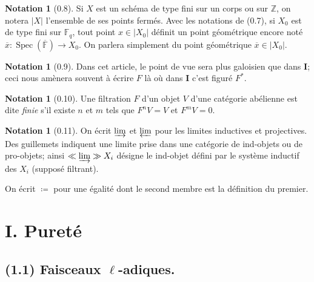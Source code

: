 \documentclass[12pt,a4paper]{article}
\theoremstyle{plain}
\theoremstyle{definition}
\newtheorem{notation}[theorem]{Notation}
\theoremstyle{definition}
\theoremstyle{remark}
\DeclareMathOperator{\Spec}{Spec}
\newcommand{\limind}{\varinjlim}
\newcommand{\limproj}{\varprojlim}
\begin{document}
\begin{notation}[0.8]
Si $X$ est un sch\'ema de type fini sur un corps ou sur $\mathbb{Z}$, on notera $|X|$ l'ensemble de ses points ferm\'es. Avec les notations de (0.7), si $X_0$ est de type fini sur $\mathbb{F}_q$, tout point $x \in |X_0|$ d\'efinit un point g\'eom\'etrique encore not\'e $\overline{x}: \Spec(\overline{\mathbb{F}}) \to X_0$. On parlera simplement du point g\'eom\'etrique $\overline{x} \in |X_0|$.
\end{notation}

\begin{notation}[0.9]
Dans cet article, le point de vue sera plus galoisien que dans \textbf{I}; ceci nous am\`enera souvent \`a \'ecrire $F$ l\`a o\`u dans \textbf{I} c'est figur\'e $F^*$.
\end{notation}

\begin{notation}[0.10]
Une filtration $F$ d'un objet $V$ d'une cat\'egorie ab\'elienne est dite \emph{finie} s'il existe $n$ et $m$ tels que $F^n V = V$ et $F^m V = 0$.
\end{notation}

\begin{notation}[0.11]
On \'ecrit $\limind$ et $\limproj$ pour les limites inductives et projectives. Des guillemets indiquent une limite prise dans une cat\'egorie de ind-objets ou de pro-objets; ainsi $\ll \limind \gg X_i$ d\'esigne le ind-objet d\'efini par le syst\`eme inductif des $X_i$ (suppos\'e filtrant).

On \'ecrit $\coloneqq$ pour une \'egalit\'e dont le second membre est la d\'efinition du premier.
\end{notation}

\newpage

\section*{I. Puret\'e}

\subsection*{(1.1) Faisceaux $\ell$-adiques.}
\end{document}
